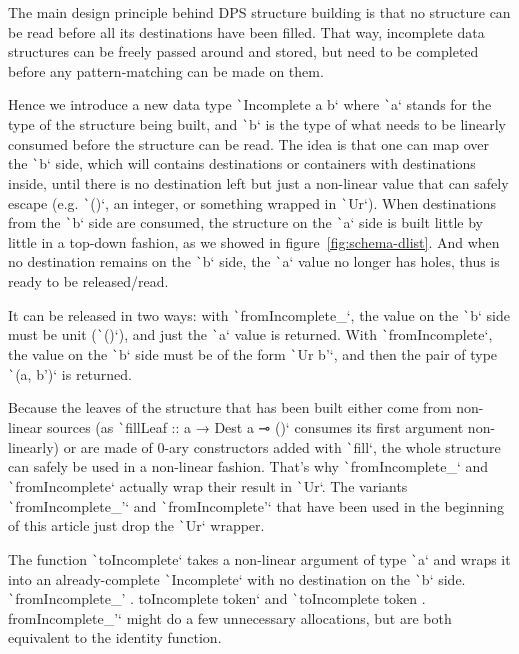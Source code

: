 \documentclass[english]{jflart}
\begin{document}
The main design principle behind DPS structure building is that no structure can be read before all its destinations have been filled. That way, incomplete data structures can be freely passed around and stored, but need to be completed before any pattern-matching can be made on them.

Hence we introduce a new data type \texttt`Incomplete a b` where \texttt`a` stands for the type of the structure being built, and \texttt`b` is the type of what needs to be linearly consumed before the structure can be read. The idea is that one can map over the \texttt`b` side, which will contains destinations or containers with destinations inside, until there is no destination left but just a non-linear value that can safely escape (e.g. \texttt`()`, an integer, or something wrapped in \texttt`Ur`). When destinations from the \texttt`b` side are consumed, the structure on the \texttt`a` side is built little by little in a top-down fashion, as we showed in figure~\ref{fig:schema-dlist}. And when no destination remains on the \texttt`b` side, the \texttt`a` value no longer has holes, thus is ready to be released/read.

It can be released in two ways: with \texttt`fromIncomplete_`, the value on the \texttt`b` side must be unit (\texttt`()`), and just the \texttt`a` value is returned. With \texttt`fromIncomplete`, the value on the \texttt`b` side must be of the form  \texttt`Ur b'`, and then the pair of type \texttt`(a, b')` is returned.

Because the leaves of the structure that has been built either come from non-linear sources (as \texttt`fillLeaf :: a → Dest a ⊸ ()` consumes its first argument non-linearly) or are made of 0-ary constructors added with \texttt`fill`, the whole structure can safely be used in a non-linear fashion. That's why \texttt`fromIncomplete_` and \texttt`fromIncomplete` actually wrap their result in \texttt`Ur`. The variants \texttt`fromIncomplete_'` and \texttt`fromIncomplete'` that have been used in the beginning of this article just drop the \texttt`Ur` wrapper.

The function \texttt`toIncomplete` takes a non-linear argument of type \texttt`a` and wraps it into an already-complete \texttt`Incomplete` with no destination on the \texttt`b` side. \texttt`fromIncomplete_' . toIncomplete token` and \texttt`toIncomplete token . fromIncomplete_'` might do a few unnecessary allocations, but are both equivalent to the identity function.
\end{document}
